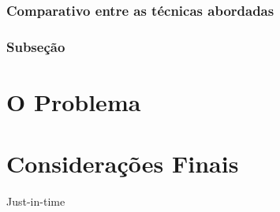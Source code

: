 \documentclass[12pt,
				openright,
				twoside,
				a4paper,
				apter=TITLE,
				section=TITLE,
				subsection=TITLE,
				chapter=TITLE,
				english,
				brazil]{abntex2}
\begin{document}
\subsection{Comparativo entre as técnicas abordadas}



\subsection{Subseção}


\chapter{O Problema}
\chapter{Considerações Finais}
Just-in-time



\end{document}
